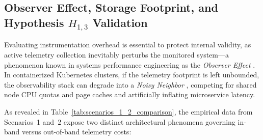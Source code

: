 \subsection{Observer Effect, Storage Footprint, and Hypothesis \texorpdfstring{$H_{1,3}$}{H1,3} Validation}

Evaluating instrumentation overhead is essential to protect internal validity, as active telemetry collection inevitably perturbs the monitored system---a phenomenon known in systems performance engineering as the \textit{Observer Effect} \cite{jain_1991, gregg_2020}. In containerized Kubernetes clusters, if the telemetry footprint is left unbounded, the observability stack can degrade into a \textit{Noisy Neighbor} \cite{krebs_2012, kuria_2024}, competing for shared node CPU quotas and page caches and artificially inflating microservice latency.

As revealed in Table~\ref{tab:scenarios_1_2_comparison}, the empirical data from Scenarios~1 and~2 expose two distinct architectural phenomena governing in-band versus out-of-band telemetry costs:

